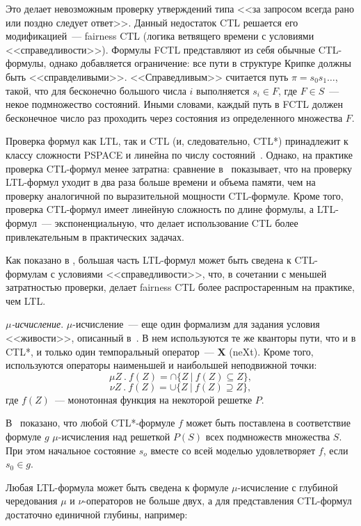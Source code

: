 \documentclass[a4paper,notitlepage,14pt]{article}
\begin{document}
Это делает невозможным проверку утверждений типа <<за запросом всегда рано или поздно
следует ответ>>. Данный недостаток CTL решается его модификацией~--- fairness CTL (логика
ветвящего времени с условиями <<справедливости>>). Формулы FCTL представляют из себя
обычные CTL-формулы, однако добавляется ограничение: все пути в структуре Крипке должны
быть <<справделивыми>>. <<Справедливым>> считается путь $\pi = s_0s_1\ldots$, такой, что
для бесконечно большого числа $i$ выполняется $s_i \in F$, где $F \in S$~--- некое
подмножество состояний. Иными словами, каждый путь в FCTL должен бесконечное число раз
проходить через состояния из определенного множества $F$.

Проверка формул как LTL, так и CTL (и, следовательно, CTL*) принадлежит к классу сложности
PSPACE и линейна по числу состояний~\cite{Sistla85complexity}. Однако, на практике
проверка CTL-формул менее затратна: сравнение в~\cite{DBLP:conf/spin/FaragoS09}
показывает, что на проверку LTL-формул уходит в два раза больше времени и объема памяти,
чем на проверку аналогичной по выразительной мощности CTL-формуле. Кроме того, проверка
CTL-формул имеет линейную сложность по длине формулы, а LTL-формул~--- экспоненциальную,
что делает использование CTL более привлекательным в практических задачах.

Как показано в \cite{Clarke97anotherlook}, большая часть LTL-формул может быть сведена к
CTL-формулам с условиями <<справедливости>>, что, в сочетании с меньшей затратностью
проверки, делает fairness CTL более распростаренным на практике, чем LTL.


\textit{$\mu$-исчисление}. $\mu$-исчисление~--- еще один формализм для задания условия
<<живости>>, описанный в~\cite{Clarke}. В нем используются те же кванторы пути, что и в
CTL*, и только один темпоральный оператор~--- $\mathbf{X}$ (neXt). Кроме того,
используются операторы наименьшей и наибольшей неподвижной точки:
$$ \mu Z~.~f(Z) = \cap \{Z~|~f(Z) \subseteq Z\}, $$
$$ \nu Z~.~f(Z) = \cup \{Z~|~f(Z) \supseteq Z\}, $$
где $f(Z)$~--- монотонная функция на некоторой решетке $P$.

В~\cite{Emerson97modelchecking} показано, что любой CTL*-формуле $f$ может быть поставлена
в соответствие формуле $g$ $\mu$-исчисления над решеткой $P(S)$ всех подмножеств множества
$S$. При этом начальное состояние $s_o$ вместе со всей моделью удовлетворяет $f$, если
$s_0 \in g$.

Любая LTL-формула может быть сведена к формуле $\mu$-исчисление с глубиной чередования
$\mu$ и $\nu$-операторов не больше двух, а для представления CTL-формул достаточно
единичной глубины, например:
\end{document}
